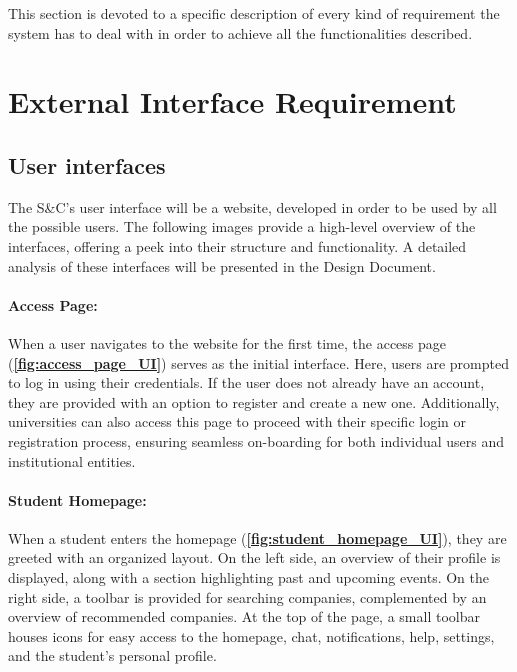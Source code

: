 This section is devoted to a specific description of every kind of requirement the system has to deal with in order to achieve all the functionalities described.


\section{External Interface Requirement}
\label{sec:external_interface_requirements}%


\subsection{User interfaces}
\label{subsec:User_interfaces}%


The S\&C's user interface will be a website, developed in order to be used by all the possible users.
The following images provide a high-level overview of the interfaces, offering a peek into their structure and functionality. A detailed analysis of these interfaces will be presented in the Design Document.


\paragraph{Access Page:} When a user navigates to the website for the first time, the access page (\textbf{\autoref{fig:access_page_UI}}) serves as the initial interface. Here, users are prompted to log in using their credentials. If the user does not already have an account, they are provided with an option to register and create a new one. Additionally, universities can also access this page to proceed with their specific login or registration process, ensuring seamless on-boarding for both individual users and institutional entities.


\paragraph{Student Homepage:} When a student enters the homepage (\textbf{\autoref{fig:student_homepage_UI}}), they are greeted with an organized layout. On the left side, an overview of their profile is displayed, along with a section highlighting past and upcoming events. On the right side, a toolbar is provided for searching companies, complemented by an overview of recommended companies. At the top of the page, a small toolbar houses icons for easy access to the homepage, chat, notifications, help, settings, and the student’s personal profile.


